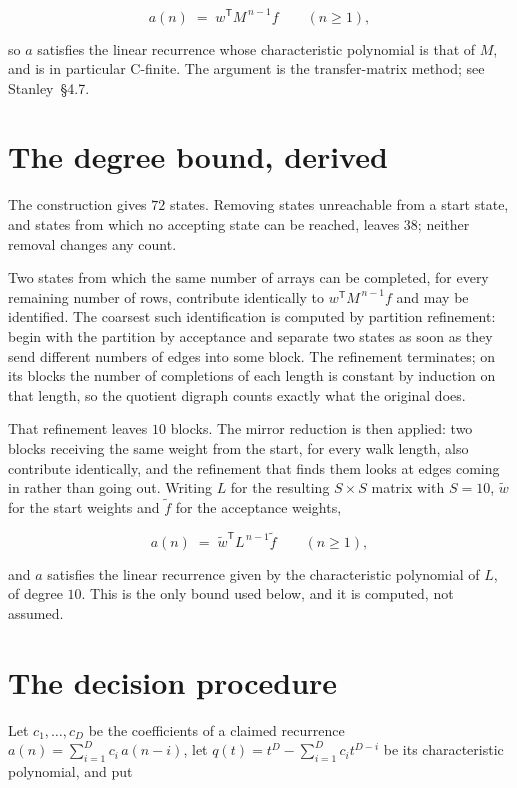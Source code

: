 \documentclass[11pt]{article}
\theoremstyle{definition}
\begin{document}
\[a(n) \;=\; w^{\mathsf T} M^{\,n-1} f \qquad (n \ge 1),\]

so $a$ satisfies the linear recurrence whose characteristic polynomial is that of $M$, and is in particular C-finite. The argument is the transfer-matrix method; see Stanley~\S4.7.

\section{The degree bound, derived}

The construction gives $72$ states. Removing states unreachable from a start state, and states from which no accepting state can be reached, leaves $38$; neither removal changes any count.

Two states from which the same number of arrays can be completed, for every remaining number of rows, contribute identically to $w^{\mathsf T}M^{\,n-1}f$ and may be identified. The coarsest such identification is computed by partition refinement: begin with the partition by acceptance and separate two states as soon as they send different numbers of edges into some block. The refinement terminates; on its blocks the number of completions of each length is constant by induction on that length, so the quotient digraph counts exactly what the original does.

That refinement leaves $10$ blocks. The mirror reduction is then applied: two blocks receiving the same weight from the start, for every walk length, also contribute identically, and the refinement that finds them looks at edges coming in rather than going out. Writing $L$ for the resulting $S \times S$ matrix with $S = 10$, $\tilde w$ for the start weights and $\tilde f$ for the acceptance weights,

\[a(n) \;=\; \tilde w^{\mathsf T} L^{\,n-1} \tilde f \qquad (n \ge 1),\]

and $a$ satisfies the linear recurrence given by the characteristic polynomial of $L$, of degree $10$. This is the only bound used below, and it is computed, not assumed.

\section{The decision procedure}

Let $c_1,\dots,c_D$ be the coefficients of a claimed recurrence $a(n) = \sum_{i=1}^{D} c_i\,a(n-i)$, let $q(t) = t^{D} - \sum_{i=1}^{D} c_i t^{D-i}$ be its characteristic polynomial, and put
\end{document}
